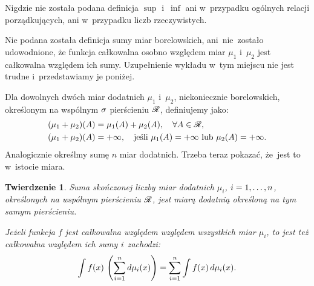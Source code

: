 \documentclass[a4paper,11pt]{article}
\newtheorem{twr}{Twierdzenie} %
\begin{document}






\noi {}

\vspace{\spaceFour}


\start Nigdzie nie została podana definicja $\sup$ i~$\inf$ ani
w~przypadku ogólnych relacji porządkujących, ani w~przypadku liczb
rzeczywistych. %



\start Nie podana została definicja sumy miar borelowskich,
ani~nie~zostało udowodnione, że funkcja całkowalna osobno względem
miar $\mu_{ 1 }$ i~$\mu_{ 2 }$ jest całkowalna względem ich sumy.
Uzupełnienie wykładu w~tym miejscu nie jest trudne i~przedstawiamy je
poniżej.

Dla dowolnych dwóch miar dodatnich $\mu_{ 1 }$ i~$\mu_{ 2 }$,
niekoniecznie borelowskich, określonym na wspólnym $\sigma$\dywiz
pierścieniu $\mathcal{R}$, definiujemy  jako:
\begin{equation}
  \label{eq:RSI1}
  \begin{split}
    (\mu_{ 1 } + \mu_{ 2 })( A ) &= \mu_{ 1 }( A ) + \mu_{ 2 }( A ),
    \quad \forall A \in \mathcal{R}, \\
    (\mu_{ 1 } + \mu_{ 2 })( A ) &= +\infty, \quad \textrm{jeśli } \mu_{ 1
    }( A ) = +\infty \textrm{ lub } \mu_{ 2 }( A ) = +\infty.
  \end{split}
\end{equation}
Analogicznie określmy sumę $n$ miar dodatnich. Trzeba teraz pokazać,
że~jest to w~istocie miara.

\begin{twr}
  Suma skończonej liczby miar dodatnich $\mu_{ i }$, $i = 1, \ldots, n$,
  określonych na wspólnym pierścieniu $\mathcal{R}$, jest miarą dodatnią
  określoną na tym samym pierścieniu.

  Jeżeli funkcja $f$ jest całkowalna względem względem wszystkich miar
  $\mu_{ i }$, to jest też całkowalna względem ich sumy i~zachodzi:
  \begin{equation}
    \label{eq:1}
    \int f( x ) \, \left( \sum\limits_{ i = 1 }^{ n } d\mu_{ i }( x ) \right)
    = \sum\limits_{ i = 1 }^{ n } \int\limits  f( x )  \, d \mu_{ i }( x ) .
  \end{equation}
\end{twr}
\end{document}
